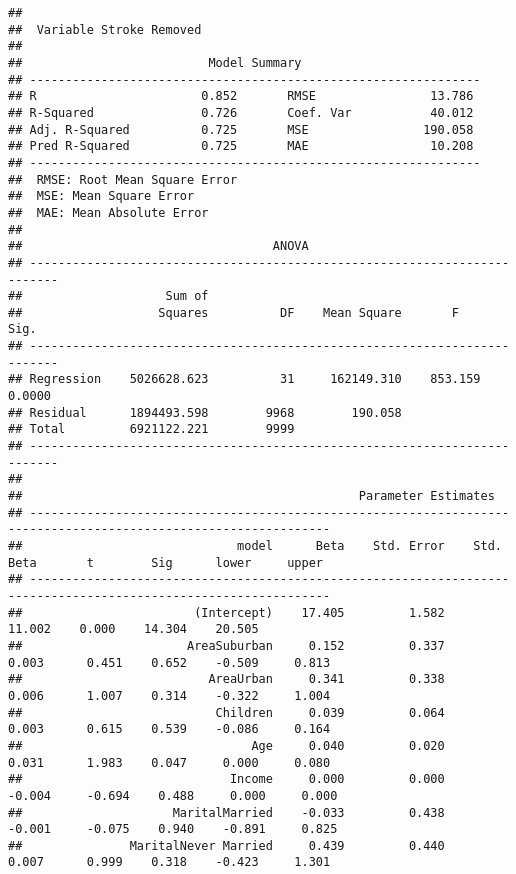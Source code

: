 \documentclass[
]{article}
\begin{document}
\begin{verbatim}
## 
##  Variable Stroke Removed 
## 
##                          Model Summary                          
## ---------------------------------------------------------------
## R                       0.852       RMSE                13.786 
## R-Squared               0.726       Coef. Var           40.012 
## Adj. R-Squared          0.725       MSE                190.058 
## Pred R-Squared          0.725       MAE                 10.208 
## ---------------------------------------------------------------
##  RMSE: Root Mean Square Error 
##  MSE: Mean Square Error 
##  MAE: Mean Absolute Error 
## 
##                                   ANOVA                                    
## --------------------------------------------------------------------------
##                    Sum of                                                 
##                   Squares          DF    Mean Square       F         Sig. 
## --------------------------------------------------------------------------
## Regression    5026628.623          31     162149.310    853.159    0.0000 
## Residual      1894493.598        9968        190.058                      
## Total         6921122.221        9999                                     
## --------------------------------------------------------------------------
## 
##                                               Parameter Estimates                                                
## ----------------------------------------------------------------------------------------------------------------
##                              model      Beta    Std. Error    Std. Beta       t        Sig      lower     upper 
## ----------------------------------------------------------------------------------------------------------------
##                        (Intercept)    17.405         1.582                  11.002    0.000    14.304    20.505 
##                       AreaSuburban     0.152         0.337        0.003      0.451    0.652    -0.509     0.813 
##                          AreaUrban     0.341         0.338        0.006      1.007    0.314    -0.322     1.004 
##                           Children     0.039         0.064        0.003      0.615    0.539    -0.086     0.164 
##                                Age     0.040         0.020        0.031      1.983    0.047     0.000     0.080 
##                             Income     0.000         0.000       -0.004     -0.694    0.488     0.000     0.000 
##                     MaritalMarried    -0.033         0.438       -0.001     -0.075    0.940    -0.891     0.825 
##               MaritalNever Married     0.439         0.440        0.007      0.999    0.318    -0.423     1.301 

\end{verbatim}
\end{document}
